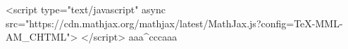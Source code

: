 <script type="text/javascript" async src="https://cdn.mathjax.org/mathjax/latest/MathJax.js?config=TeX-MML-AM_CHTML"> </script>
aaa^{ccc\frac{}{}}aaa
